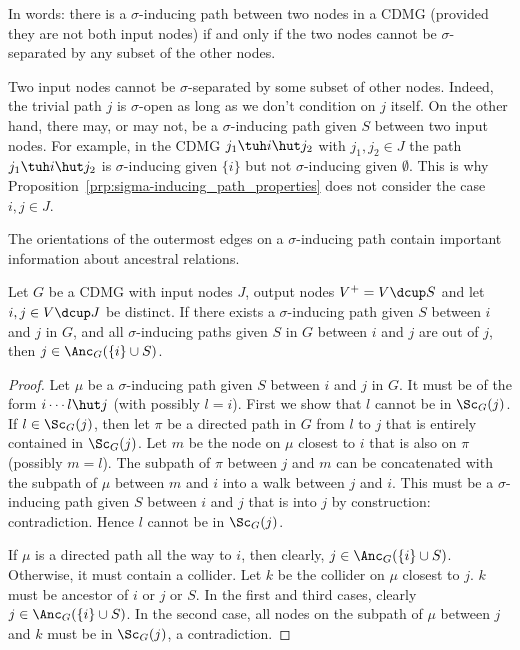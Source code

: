In words: there is a $\sigma$-inducing path between two nodes in a CDMG (provided they are not both input nodes) if and only if the two nodes cannot be $\sigma$-separated by any subset of the other nodes.
\begin{Rem}
Two input nodes cannot be $\sigma$-separated by some subset of other nodes.
Indeed, the trivial path $j$ is $\sigma$-open as long as we don't condition on $j$ itself.
On the other hand, there may, or may not, be a $\sigma$-inducing path given $S$ between two input nodes. 
For example, in the CDMG $j_1 \tuh i \hut j_2$ with $j_1,j_2 \in J$ the path $j_1 \tuh i \hut j_2$
is $\sigma$-inducing given $\{i\}$ but not $\sigma$-inducing given $\emptyset$.
This is why Proposition~\ref{prp:sigma-inducing_path_properties} does not consider the case $i,j \in J$.
\end{Rem}

The orientations of the outermost edges on a $\sigma$-inducing path contain important information about ancestral relations.
\begin{Lem}\label{lem:sigma-inducing_path_out-of}
  Let $G$ be a CDMG with input nodes $J$, output nodes $V^+ = V \dcup S$ and let $i,j \in V \dcup J$ be distinct.
  If there exists a $\sigma$-inducing path given $S$ between $i$ and $j$ in $G$,
  and all $\sigma$-inducing paths given $S$ in $G$ between $i$ and $j$ are out of $j$, then $j \in \Anc_G(\{i\} \cup S)$.
\end{Lem}
\begin{proof}
  Let $\mu$ be a $\sigma$-inducing path given $S$ between $i$ and $j$ in $G$. 
  It must be of the form $i \cdots l \hut j$ (with possibly $l = i$). 
  First we show that $l$ cannot be in $\Sc_G(j)$.
  If $l \in \Sc_G(j)$, then let $\pi$ be a directed path in $G$ from $l$ to $j$ that is entirely contained in $\Sc_G(j)$.
  Let $m$ be the node on $\mu$ closest to $i$ that is also on $\pi$ (possibly $m = l$).
  The subpath of $\pi$ between $j$ and $m$ can be concatenated with the subpath of $\mu$ between $m$ and $i$ into a walk between $j$ and $i$.
  This must be a $\sigma$-inducing path given $S$ between $i$ and $j$ that is into $j$ by construction: contradiction.
  Hence $l$ cannot be in $\Sc_G(j)$.

  If $\mu$ is a directed path all the way to $i$, then clearly, $j \in \Anc_G(\{i\} \cup S)$.
  Otherwise, it must contain a collider.
  Let $k$ be the collider on $\mu$ closest to $j$.
  $k$ must be ancestor of $i$ or $j$ or $S$.
  In the first and third cases, clearly $j \in \Anc_G(\{i\} \cup S)$.
  In the second case, all nodes on the subpath of $\mu$ between $j$ and $k$ must be in $\Sc_G(j)$, a contradiction.
\end{proof}

